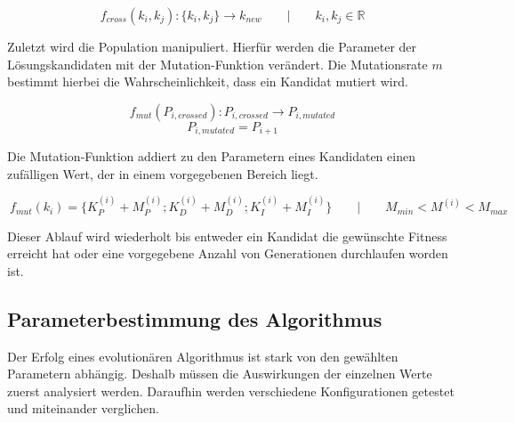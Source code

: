 \documentclass{article}
\begin{document}
\[\ f_{cross}(k_i,k_j) : \{k_i, k_j \} \rightarrow k_{new} \qquad 
\vert \qquad k_i,k_j \in \mathbb{R} \]

Zuletzt wird die Population manipuliert. Hierfür werden die Parameter der Lösungskandidaten mit der Mutation-Funktion verändert. Die Mutationsrate $m$ bestimmt hierbei die Wahrscheinlichkeit, dass ein Kandidat mutiert wird.

\[\ f_{mut}(P_{i,crossed}) : P_{i,crossed} \rightarrow P_{i,mutated} \]
\[\ P_{i, mutated} = P_{i+1} \]

Die Mutation-Funktion addiert zu den Parametern eines Kandidaten einen zufälligen Wert, der in einem vorgegebenen Bereich liegt.

\[\ f_{mut}(k_i) = \{ K_P^{(i)} + M_P^{(i)}; K_D^{(i)} + M_D^{(i)}; K_I^{(i)} + M_I^{(i)} \}
\qquad \vert \qquad M_{min} < M^{(i)} < M_{max} \]

Dieser Ablauf wird wiederholt bis entweder ein Kandidat die gewünschte Fitness erreicht hat oder eine vorgegebene Anzahl von Generationen durchlaufen worden ist.

\subsection*{Parameterbestimmung des Algorithmus}
Der Erfolg eines evolutionären Algorithmus ist stark von den gewählten Parametern abhängig. Deshalb müssen die Auswirkungen der einzelnen Werte zuerst analysiert werden. Daraufhin werden verschiedene Konfigurationen getestet und miteinander verglichen.
\end{document}
